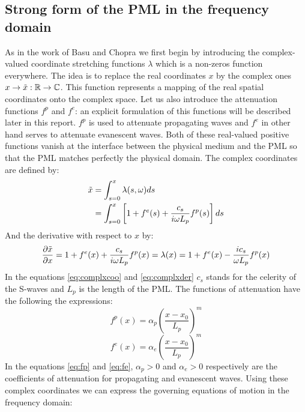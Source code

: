 \subsection{Strong form of the PML in the frequency domain}
As in the work of Basu and Chopra \cite{Basu2003} we first begin by introducing the complex-valued coordinate stretching functions $\lambda$ which is a non-zeros function everywhere. The idea is to replace the real coordinates $x$ by the complex ones $x \rightarrow \Tilde{x} : \mathbb{R} \rightarrow \mathbb{C}$. This function represents a mapping of the real spatial coordinates onto the complex space. Let us also introduce the attenuation functions $f^p$ and $f^e$: an explicit formulation of this functions will be described later in this report. $f^p$ is used to attenuate propagating waves and $f^e$ in other hand serves to attenuate evanescent waves. Both of these real-valued positive functions vanish at the interface between the physical medium and the PML so that the PML matches perfectly the physical domain. The complex coordinates are defined by:
\begin{equation}
    \begin{aligned}
        \Tilde{x} &= \int^x_{s=0} \lambda(s,\omega) ds\\
        &= \int^x_{s=0} \left[ 1+f^e(s) +\frac{c_s}{i\omega L_p} f^p(s)  \right] ds
    \end{aligned}
    \label{eq:complxcoo}
\end{equation}
And the derivative with respect to $x$ by:
\begin{equation}
    \frac{\partial \Tilde{x}}{\partial x} = 1+f^e(x)+\frac{c_s}{i\omega L_p} f^p(x)= \lambda(x)= 1+f^e(x)-\frac{i c_s}{\omega L_p} f^p(x)
    \label{eq:complxder}
\end{equation}
In the equations \ref{eq:complxcoo} and \ref{eq:complxder} $c_s$ stands for the celerity of the S-waves and $L_p$ is the length of the PML. The functions of attenuation have the following the expressions:
\begin{equation}
    f^p(x) = \alpha_p \left(\frac{x-x_0}{L_p}\right)^m
    \label{eq:fp}
\end{equation}
\begin{equation}
    f^e(x) = \alpha_e \left(\frac{x-x_0}{L_p}\right)^m
    \label{eq:fe}
\end{equation}
In the equations \ref{eq:fp} and \ref{eq:fe}, $\alpha_p > 0$ and $\alpha_e > 0$ respectively are the coefficients of attenuation for propagating and evanescent waves.
Using these complex coordinates we can express the governing equations of motion in the frequency domain:
